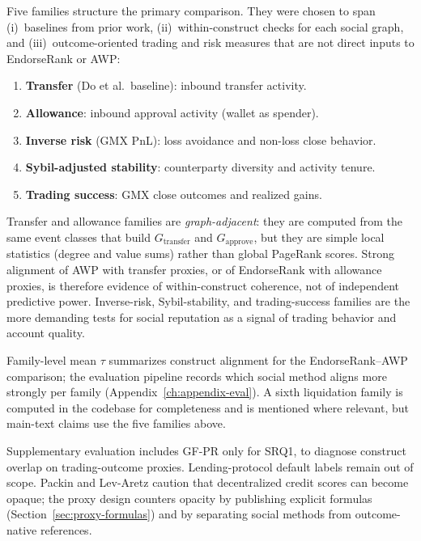 Five families structure the primary comparison. They were chosen to span (i)~baselines from prior work, (ii)~within-construct checks for each social graph, and (iii)~outcome-oriented trading and risk measures that are not direct inputs to EndorseRank or AWP:
\begin{enumerate}
\item \textbf{Transfer} (Do et al.\ baseline): inbound transfer activity.
\item \textbf{Allowance}: inbound approval activity (wallet as spender).
\item \textbf{Inverse risk} (GMX PnL): loss avoidance and non-loss close behavior.
\item \textbf{Sybil-adjusted stability}: counterparty diversity and activity tenure.
\item \textbf{Trading success}: GMX close outcomes and realized gains.
\end{enumerate}
Transfer and allowance families are \emph{graph-adjacent}: they are computed from the same event classes that build $G_{\mathrm{transfer}}$ and $G_{\mathrm{approve}}$, but they are simple local statistics (degree and value sums) rather than global PageRank scores. Strong alignment of AWP with transfer proxies, or of EndorseRank with allowance proxies, is therefore evidence of within-construct coherence, not of independent predictive power. Inverse-risk, Sybil-stability, and trading-success families are the more demanding tests for social reputation as a signal of trading behavior and account quality.

Family-level mean $\tau$ summarizes construct alignment for the EndorseRank--AWP comparison; the evaluation pipeline records which social method aligns more strongly per family (Appendix~\ref{ch:appendix-eval}). A sixth liquidation family is computed in the codebase for completeness and is mentioned where relevant, but main-text claims use the five families above.

Supplementary evaluation includes GF-PR only for SRQ1, to diagnose construct overlap on trading-outcome proxies. Lending-protocol default labels remain out of scope. Packin and Lev-Aretz caution that decentralized credit scores can become opaque; the proxy design counters opacity by publishing explicit formulas (Section~\ref{sec:proxy-formulas}) and by separating social methods from outcome-native references.


